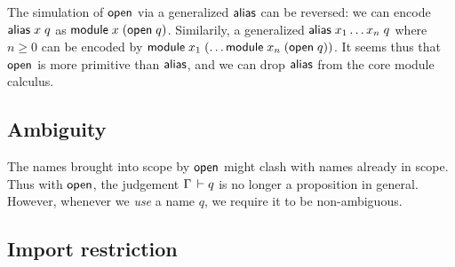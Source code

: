 \documentclass{article}
\theoremstyle{definition}
\theoremstyle{plain}
\theoremstyle{remark}
\begin{document}
The simulation of $\mathsf{open}$ via a generalized $\mathsf{alias}$ can be
reversed: we can encode $\mathsf{alias}\;x\;q$ as $\mathsf{module}\;x\;(\mathsf{open}\;q)$.
Similarily, a generalized $\mathsf{alias}\;x_1\dots x_n\;q$ where $n \geq 0$
can be encoded by $\mathsf{module}\;x_1\;(\dots \mathsf{module}\;x_n\;(\mathsf{open}\;q))$.
It seems thus that $\mathsf{open}$ is more primitive than $\mathsf{alias}$, and we
can drop $\mathsf{alias}$ from the core module calculus.


\subsection{Ambiguity}

The names brought into scope by $\mathsf{open}$ might clash with names
already in scope.  Thus with $\mathsf{open}$, the judgement
$\Gamma\,\vdash q$ is no longer a proposition in general.
However, whenever we \emph{use} a name $q$,
we require it to be non-ambiguous.


\subsection{Import restriction}
\end{document}
